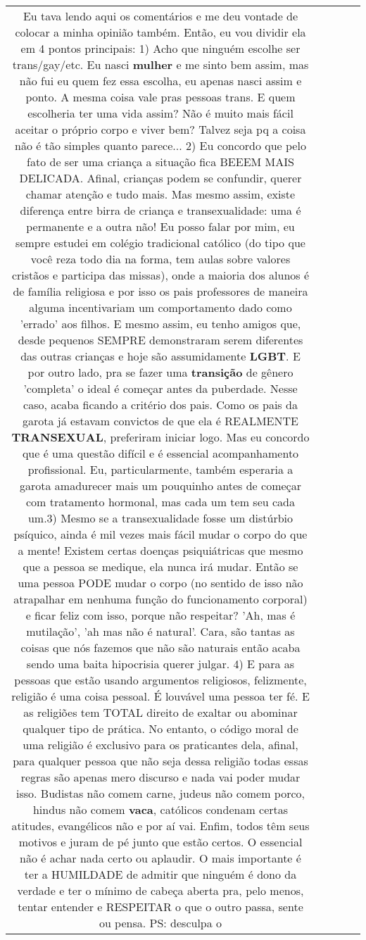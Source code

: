 \documentclass[11pt]{article}
\newlength\mylength
\begin{document}
\begin{center}
\begin{longtable}{|C{.65\mylength}|C{.30\mylength}|C{.12\mylength}|C{.12\mylength}|C{.12\mylength}|}
  \small Eu tava lendo aqui os comentários e me deu vontade de colocar a minha opinião também. Então, eu vou dividir ela em 4 pontos principais: 1) Acho que ninguém escolhe ser trans/gay/etc. Eu nasci \textbf{mulher} e me sinto bem assim, mas não fui eu quem fez essa escolha, eu apenas nasci assim e ponto. A mesma coisa vale pras pessoas trans. E quem escolheria ter uma vida assim? Não é muito mais fácil aceitar o próprio corpo e viver bem? Talvez seja pq a coisa não é tão simples quanto parece... 2) Eu concordo que pelo fato de ser uma criança a situação fica BEEEM MAIS DELICADA. Afinal, crianças podem se confundir, querer chamar atenção e tudo mais. Mas mesmo assim, existe diferença entre birra de criança e transexualidade: uma é permanente e a outra não! Eu posso falar por mim, eu sempre estudei em colégio tradicional católico (do tipo que você reza todo dia na forma, tem aulas sobre valores cristãos e participa das missas), onde a maioria dos alunos é de família religiosa e por isso os pais professores de maneira alguma incentivariam um comportamento dado como 'errado'  aos filhos.  E mesmo assim, eu tenho amigos que, desde pequenos SEMPRE demonstraram serem diferentes das outras crianças e hoje são assumidamente \textbf{LGBT}. E por outro lado, pra se fazer uma \textbf{transição} de gênero 'completa' o ideal é começar antes da puberdade. Nesse caso, acaba ficando a critério dos pais. Como os pais da garota já estavam convictos de que ela é REALMENTE \textbf{TRANSEXUAL}, preferiram iniciar logo. Mas eu concordo que é uma questão difícil e é essencial acompanhamento profissional. Eu, particularmente, também esperaria a garota amadurecer mais um pouquinho antes de começar com tratamento hormonal, mas cada um tem seu cada um.3) Mesmo se a transexualidade fosse um distúrbio psíquico, ainda é mil vezes mais fácil mudar o corpo do que a mente! Existem certas doenças psiquiátricas que mesmo que a pessoa se medique, ela nunca irá mudar. Então se uma pessoa PODE mudar o corpo (no sentido de isso não atrapalhar em nenhuma função do funcionamento corporal) e ficar feliz com isso, porque não respeitar? 'Ah, mas é mutilação', 'ah mas não é natural'. Cara, são tantas as coisas que nós fazemos que não são naturais então acaba sendo uma baita hipocrisia querer julgar. 4) E para as pessoas que estão usando argumentos religiosos, felizmente, religião é uma coisa pessoal. É louvável uma pessoa ter fé. E as religiões tem TOTAL direito de exaltar ou abominar qualquer tipo de prática. No entanto, o código moral de uma religião é exclusivo para os praticantes dela, afinal, para qualquer pessoa que não seja dessa religião todas essas regras são apenas mero discurso e nada vai poder mudar isso. Budistas não comem carne, judeus não comem porco, hindus não comem \textbf{vaca}, católicos condenam certas atitudes, evangélicos não e por aí vai. Enfim, todos têm seus motivos e juram de pé junto que estão certos. O essencial não é achar nada certo ou aplaudir. O mais importante é ter a HUMILDADE de admitir que ninguém é dono da verdade e ter o mínimo de cabeça aberta pra, pelo menos, tentar entender e RESPEITAR o que o outro passa, sente ou pensa. PS: desculpa o 
\end{longtable}
\end{center}
\end{document}
